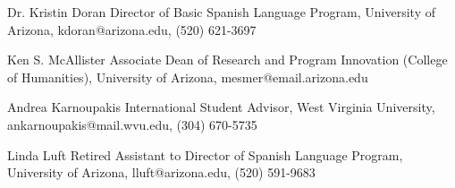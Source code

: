 


\begin{cvskills}


\cvskill
{Dr. Kristin Doran} %
{Director of Basic Spanish Language Program, 
University of Arizona,\newline
kdoran@arizona.edu, 
(520) 621-3697} %

\cvskill
{Ken S. McAllister} %
{Associate Dean of Research and Program Innovation (College of Humanities),
University of Arizona,\newline 
mesmer@email.arizona.edu} %

\cvskill
{Andrea Karnoupakis} %
{International Student Advisor, 
West Virginia University, \newline 
ankarnoupakis@mail.wvu.edu, 
(304) 670-5735} %

\cvskill
{Linda Luft} %
{Retired Assistant to Director of Spanish Language Program, 
University of Arizona, \newline
lluft@arizona.edu, 
(520) 591-9683} %

\vspace{-7mm}
\end{cvskills}
